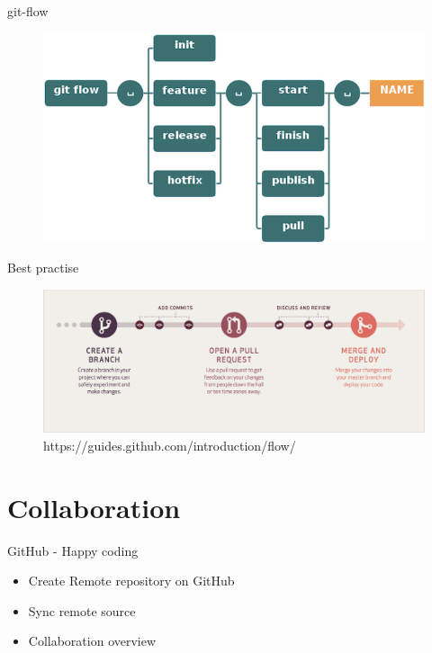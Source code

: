 \documentclass{beamer}
\begin{document}
\begin{frame}{git-flow}
    \begin{figure}
        \center
        \includegraphics[width=.9\textwidth]{git-flow-commands}
        \label{fig:git-flow-commands}
    \end{figure}
\end{frame}

\begin{frame}{Best practise}
    \begin{figure}
        \center
        \includegraphics[width=.9\textwidth]{git-workflow}
        \caption{https://guides.github.com/introduction/flow/}
        \label{fig:git-workflow}
    \end{figure}
\end{frame}

\section{Collaboration}
\begin{frame}{GitHub - Happy coding}
    \begin{itemize}
        \item Create Remote repository on GitHub
        \item Sync remote source
        \item Collaboration overview
    \end{itemize}
\end{frame}
\end{document}
